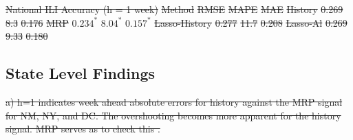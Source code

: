 \documentclass[fleqn,10pt]{wlscirep}
\providecommand{\DIFdel}[1]{{\protect\color{red}\sout{#1}}}                      %
\providecommand{\DIFdelbegin}{} %
\providecommand{\DIFdelend}{} %
\providecommand{\DIFdelFL}[1]{\DIFdel{#1}} %
\begin{document}
\DIFdelbegin %
{%
\DIFdelFL{National ILI Accuracy (h = 1 week)}}
\DIFdelFL{Method        }%
\DIFdelFL{RMSE  }%
\DIFdelFL{MAPE  }%
\DIFdelFL{MAE }%
\DIFdelFL{History       }%
\DIFdelFL{0.269 }%
\DIFdelFL{8.3  }%
\DIFdelFL{0.176}%
\DIFdelFL{MRP           }%
\DIFdelFL{$\mathbf{0.234^*}$ }%
\DIFdelFL{$\mathbf{8.04^*}$ }%
\DIFdelFL{$\mathbf{0.157^*}$}%
\DIFdelFL{Lasso-History }%
\DIFdelFL{0.277 }%
\DIFdelFL{11.7 }%
\DIFdelFL{0.208}%
\DIFdelFL{Lasso-Al      }%
\DIFdelFL{0.269 }%
\DIFdelFL{9.33 }%
\DIFdelFL{0.180}%

\DIFdelend \subsection*{State Level Findings}

\DIFdelbegin %
{%
\DIFdelFL{a) h=1 indicates week ahead absolute errors for history against the MRP signal for NM,  NY, and DC. The overshooting becomes more apparent for the history signal. MRP serves as to check this .}}
\DIFdelend %
\end{document}
